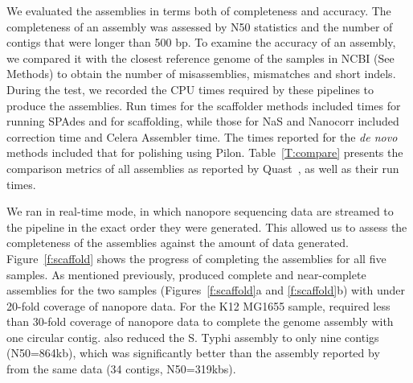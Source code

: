 We evaluated the assemblies in terms both of completeness and accuracy.
The completeness of an assembly was assessed by N50 statistics and the
number of contigs that were longer than 500 bp. To examine the accuracy of an
assembly, we compared it with the closest reference genome of the samples in
NCBI (See Methods) to obtain the number of misassemblies, mismatches and
short indels.
During the test, we recorded the CPU times
required by these pipelines to produce the assemblies. Run times for
the scaffolder methods included times for running SPAdes and for scaffolding,
while those for NaS and Nanocorr included correction time and Celera
Assembler time.
The times reported for the \emph{de novo} methods included that for
polishing using Pilon.
Table~\ref{T:compare} presents the comparison metrics of all assemblies as 
reported by Quast~\cite{GurevichSV2013}, as well as their run times. 
 
We ran \npscarf{} in real-time mode, in which nanopore sequencing data are
streamed to the pipeline in the exact order they were generated.
This allowed us to assess the completeness of the assemblies against the 
amount of data generated.
Figure~\ref{f:scaffold} shows the progress of completing the assemblies
for all five samples. As mentioned previously, \npscarf{} produced complete and
near-complete assemblies for the two \kp{} samples (Figures~\ref{f:scaffold}a
and \ref{f:scaffold}b) with under 20-fold coverage of nanopore data.
For the \ec{} K12 MG1655 sample, \npscarf{} required less than 30-fold coverage of 
nanopore data to complete the genome assembly with one circular contig.
\npscarf{} also reduced the S. Typhi assembly to only nine contigs (N50=864kb),
which was significantly better than the assembly reported by~\cite{AshtonND2015} 
from the same data (34 contigs, N50=319kbs).

